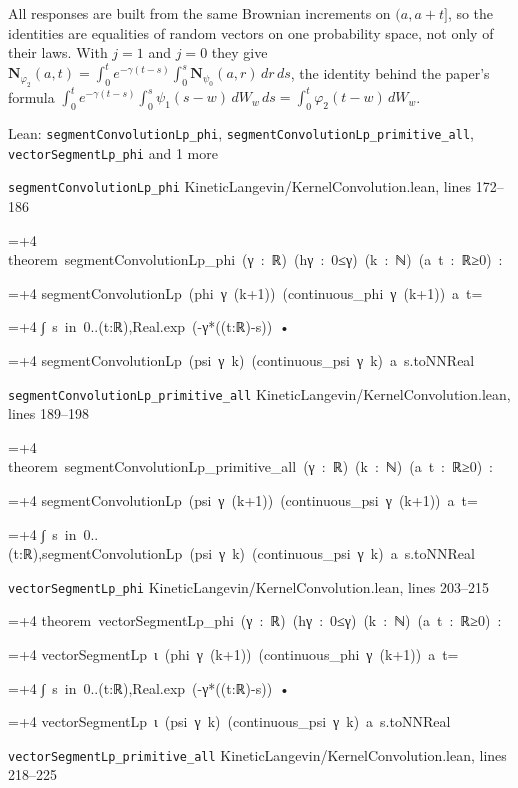 \documentclass[11pt,a4paper]{article}
\newlength{\leancharwidth}
\newenvironment{leancode}{\par\smallskip\begingroup\ttfamily\footnotesize\raggedright
  \settowidth{\leancharwidth}{M}\setlength{\parskip}{0pt}\setlength{\parindent}{0pt}
  \frenchspacing}{\par\endgroup\smallskip}
\newcommand{\leanline}[2]{\hangindent=\dimexpr#1\leancharwidth+4\leancharwidth\relax
  \hangafter=1\noindent\hspace*{#1\leancharwidth}#2\par}
\newcommand{\leansource}[1]{\par{\footnotesize\color{leanmuted}#1}\par}
\begin{document}
All responses are built from the same Brownian increments on \((a,a+t]\), so the identities are equalities of random vectors on one probability space, not only of their laws. With \(j=1\) and \(j=0\) they give \(\mathbf N_{\varphi_2}(a,t)=\int_0^te^{-\gamma(t-s)}\int_0^s\mathbf N_{\psi_0}(a,r)\,dr\,ds\), the identity behind the paper's formula \(\int_0^te^{-\gamma(t-s)}\int_0^s\psi_1(s-w)\,dW_w\,ds=\int_0^t\varphi_2(t-w)\,dW_w\).

\begin{leanbox}{Lean: \texttt{segmentConvolutionLp\_\allowbreak{}phi}, \texttt{segmentConvolutionLp\_\allowbreak{}primitive\_\allowbreak{}all}, \texttt{vectorSegmentLp\_\allowbreak{}phi} and 1 more}
\leansource{\texttt{segmentConvolutionLp\_\allowbreak{}phi} \quad KineticLangevin/\allowbreak{}KernelConvolution.lean, lines 172–186}
\begin{leancode}
\leanline{0}{theorem\ segmentConvolutionLp\_phi\ (γ\ :\ ℝ)\ (hγ\ :\ 0≤γ)\ (k\ :\ ℕ)\ (a\ t\ :\ ℝ≥0)\ :}
\leanline{4}{segmentConvolutionLp\ (phi\ γ\ (k+1))\ (continuous\_phi\ γ\ (k+1))\ a\ t=}
\leanline{6}{∫\ s\ in\ 0..(t:ℝ),Real.exp\ (-γ*((t:ℝ)-s))\ •}
\leanline{8}{segmentConvolutionLp\ (psi\ γ\ k)\ (continuous\_psi\ γ\ k)\ a\ s.toNNReal}
\end{leancode}
\leansource{\texttt{segmentConvolutionLp\_\allowbreak{}primitive\_\allowbreak{}all} \quad KineticLangevin/\allowbreak{}KernelConvolution.lean, lines 189–198}
\begin{leancode}
\leanline{0}{theorem\ segmentConvolutionLp\_primitive\_all\ (γ\ :\ ℝ)\ (k\ :\ ℕ)\ (a\ t\ :\ ℝ≥0)\ :}
\leanline{4}{segmentConvolutionLp\ (psi\ γ\ (k+1))\ (continuous\_psi\ γ\ (k+1))\ a\ t=}
\leanline{6}{∫\ s\ in\ 0..(t:ℝ),segmentConvolutionLp\ (psi\ γ\ k)\ (continuous\_psi\ γ\ k)\ a\ s.toNNReal}
\end{leancode}
\leansource{\texttt{vectorSegmentLp\_\allowbreak{}phi} \quad KineticLangevin/\allowbreak{}KernelConvolution.lean, lines 203–215}
\begin{leancode}
\leanline{0}{theorem\ vectorSegmentLp\_phi\ (γ\ :\ ℝ)\ (hγ\ :\ 0≤γ)\ (k\ :\ ℕ)\ (a\ t\ :\ ℝ≥0)\ :}
\leanline{4}{vectorSegmentLp\ ι\ (phi\ γ\ (k+1))\ (continuous\_phi\ γ\ (k+1))\ a\ t=}
\leanline{6}{∫\ s\ in\ 0..(t:ℝ),Real.exp\ (-γ*((t:ℝ)-s))\ •}
\leanline{8}{vectorSegmentLp\ ι\ (psi\ γ\ k)\ (continuous\_psi\ γ\ k)\ a\ s.toNNReal}
\end{leancode}
\leansource{\texttt{vectorSegmentLp\_\allowbreak{}primitive\_\allowbreak{}all} \quad KineticLangevin/\allowbreak{}KernelConvolution.lean, lines 218–225}
\begin{leancode}

\end{leancode}
\end{leanbox}
\end{document}
